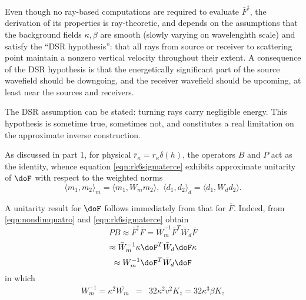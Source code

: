 Even though no ray-based computations are required to evaluate $\bar{F}^{\ddagger}$,
the derivation of its properties is
ray-theoretic, and depends on the assumptions
that the background fields $\kappa, \beta$ are smooth (slowly varying
on wavelenghth scale) and satisfy the ``DSR hypothesis'': that all
rays from source or receiver to scattering point maintain a nonzero
vertical velocity throughout their extent. A consequence of the DSR
hypothesis is that the energetically significant part of the source
wavefield should be downgoing, and the receiver wavefield should be
upcoming, at least near the sources and receivers.

The DSR assumption can be
stated: turning rays carry negligible energy. This hypothesis is
sometime true, sometimes not, and constitutes a real limitation on the
approximate inverse construction.

As discussed in part 1, for physical $\bar{r}_{\kappa} =
r_{\kappa}\delta(h)$, the operators $B$ and $P$ act as the identity, 
whence equation \ref{eqn:rk6sigmaterce} exhibits approximate unitarity 
of $\doF$ with respect to the weighted norms 
\begin{equation}
\label{eqn:wnorms}
\langle m_1,m_2\rangle_m = \langle m_1,W_m m_2 \rangle,\,\, 
\langle d_1,d_2\rangle_d = \langle d_1,W_d d_2 \rangle. 
\end{equation}

A unitarity result for $\doF$ follows immediately from that for
$\bar{F}$. Indeed, from \ref{eqn:nondimquatro} and
\ref{eqn:rk6sigmaterce} obtain
\[
PB \approx \bar{F}^{\ddagger} \bar{F} = \bar{W}_m^{-1} \bar{F}^T
\bar{W}_d  \bar{F} 
\]
\[
\approx \bar{W}_m^{-1} \kappa \doF^T \bar{W}_d \doF \kappa
\]
\begin{equation}
\label{eqn:rk6sigmaquatro}
\approx W_m^{-1}\doF^T \bar{W}_d \doF 
\end{equation}
in which
\begin{eqnarray}
\label{eqn:wmdefk}
W_m^{-1} = \kappa^2 \bar{W_m} &=& 32 \kappa^2 v^2 K_z = 32 \kappa^3 \beta
                             K_z
\end{eqnarray}

